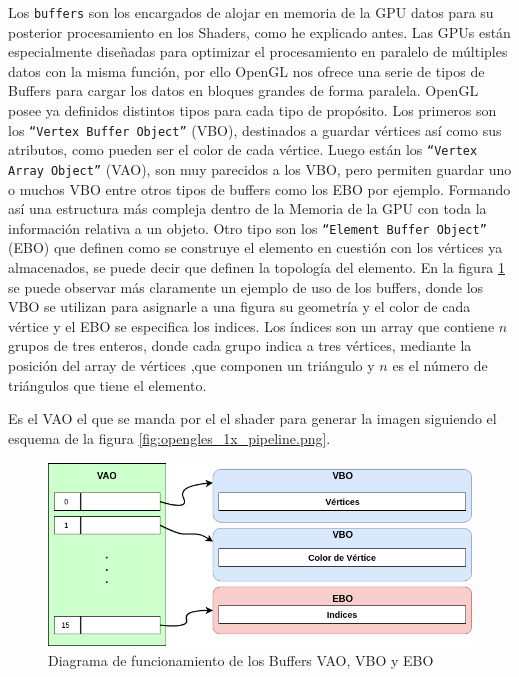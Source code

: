 Los \texttt{buffers}  son los encargados de alojar en memoria de la GPU datos para su posterior procesamiento en los Shaders, como he explicado antes. Las GPUs están especialmente diseñadas para optimizar el procesamiento en paralelo de múltiples datos con la misma función,  por ello OpenGL nos ofrece una serie de tipos de Buffers para cargar los datos en bloques grandes de forma paralela. OpenGL posee ya definidos distintos tipos para cada tipo de propósito. Los primeros son los \texttt{``Vertex Buffer Object''} (VBO), destinados a guardar vértices así como sus atributos, como pueden ser el color de cada vértice. Luego están los \texttt{``Vertex Array Object''} (VAO), son muy parecidos a los VBO, pero permiten guardar uno o muchos VBO entre otros tipos de buffers como los EBO por ejemplo. Formando así una estructura más compleja dentro de la Memoria de la GPU con toda la información relativa a un objeto. Otro tipo son los \texttt{``Element Buffer Object''} (EBO) que definen como se construye el elemento en cuestión con los vértices ya almacenados, se puede decir que definen la topología del elemento. En la figura \ref{fig:dia_buffers.png} se puede observar más claramente un ejemplo de uso de los buffers, donde los VBO se utilizan para asignarle a una figura su geometría y el color de cada vértice y el EBO se especifica los indices. Los índices son un array que contiene $n$ grupos de tres enteros, donde cada grupo indica a tres vértices, mediante la posición del array de vértices ,que componen un triángulo y $n$ es el número de triángulos que tiene el elemento. 

Es el VAO el que se manda por el el shader para generar la imagen siguiendo el esquema de la figura \ref{fig:opengles_1x_pipeline.png}.


\begin{figure} %
	\centering
	\includegraphics[scale=0.5]{imagenes/dia_buffers.png} 
	\caption{ Diagrama de funcionamiento de los Buffers VAO, VBO y EBO } \label{fig:dia_buffers.png}
\end{figure}


